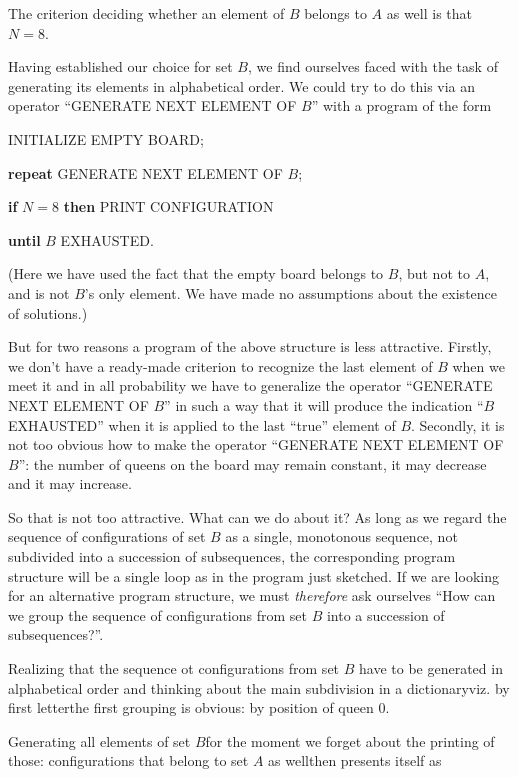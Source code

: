 The criterion deciding whether an element of $B$ belongs to $A$ as well is that $N = 8$.

Having established our choice for set $B$, we find ourselves faced with the task of generating its elements in alphabetical order. We could try to do this via an operator ``GENERATE NEXT ELEMENT OF $B$'' with a program of the form

INITIALIZE EMPTY BOARD;

\textbf{\textbf{repeat}} GENERATE NEXT ELEMENT OF $B$;

\quad \textbf{if} $N = 8$ \textbf{then} PRINT CONFIGURATION

\textbf{until} $B$ EXHAUSTED.

\noindent
(Here we have used the fact that the empty board belongs to $B$, but not to $A$, and is not $B$'s only element. We have made no assumptions about the existence of solutions.)

But for two reasons a program of the above structure is less attractive. Firstly, we don't have a ready-made criterion to recognize the last element of $B$ when we meet it and in all probability we have to generalize the operator ``GENERATE NEXT ELEMENT OF $B$'' in such a way that it will produce the indication ``$B$ EXHAUSTED'' when it is applied to the last ``true'' element of $B$. Secondly, it is not too obvious how to make the operator ``GENERATE NEXT ELEMENT OF $B$'': the number of queens on the board may remain constant, it may decrease and it may increase.

So that is not too attractive. What can we do about it? As long as we regard the sequence of configurations of set $B$ as a single, monotonous sequence, not subdivided into a succession of subsequences, the corresponding program structure will be a single loop as in the program just sketched. If we are looking for an alternative program structure, we must \textit{therefore} ask ourselves ``How can we group the sequence of configurations from set $B$ into a succession of subsequences?''.

Realizing that the sequence ot configurations from set $B$ have to be generated in alphabetical order and thinking about the main subdivision in a dictionary\textemdash{}viz. by first letter\textemdash{}the first grouping is obvious: by position of queen 0.

Generating all elements of set $B$\textemdash{}for the moment we forget about the printing of those: configurations that belong to set $A$ as well\textemdash{}then presents itself as

